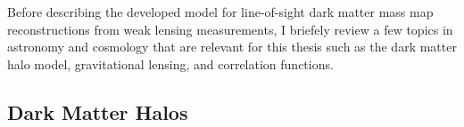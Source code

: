 \documentclass[%
 reprint,
 amsmath,amssymb,
 aps,nofootinbib
]{revtex4-1}
\begin{document}
Before describing the developed model for line-of-sight dark matter mass map reconstructions from weak lensing measurements, I briefely review a few topics in astronomy and cosmology that are relevant for this thesis such as the dark matter halo model, gravitational lensing, and correlation functions.

\subsection{Dark Matter Halos} \label{halos}

\end{document}
